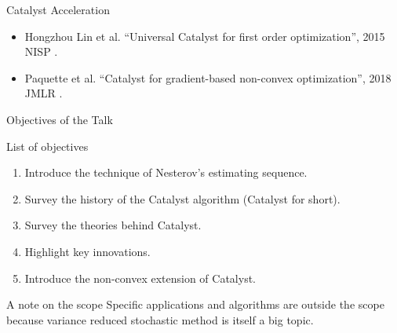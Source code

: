 \documentclass[11pt]{beamer}
\begin{document}
        \begin{frame}{Catalyst Acceleration}
            \begin{figure}
                \centering
            \end{figure}
            \begin{itemize}
                \item Hongzhou Lin et al. ``Universal Catalyst for first order optimization'', 2015 NISP \cite{lin_universal_2015}.
                \item Paquette et al. ``Catalyst for gradient-based non-convex optimization'', 2018 JMLR \cite{paquette_catalyst_2018}. 
            \end{itemize}
        \end{frame}
        \begin{frame}{Objectives of the Talk}
            \begin{block}{List of objectives}
                \begin{enumerate}
                    \item Introduce the technique of Nesterov's estimating sequence. 
                    \item Survey the history of the Catalyst algorithm (Catalyst for short).  
                    \item Survey the theories behind Catalyst. 
                    \item Highlight key innovations. 
                    \item Introduce the non-convex extension of Catalyst. 
                \end{enumerate}
            \end{block}
            \pause
            \begin{block}{A note on the scope}
                Specific applications and algorithms are outside the scope because variance reduced stochastic method is itself a big topic.     
            \end{block}
        \end{frame}
\end{document}
